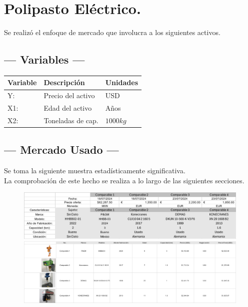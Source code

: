 
\section{Polipasto Eléctrico.} %
Se realizó el enfoque de mercado que involucra a los siguientes activos.

\subsection{\centering --- Variables ---} %
\begin{center}
  \begin{tabular}{|l|l|l|}
    \hline 
    Variable & Descripción   & Unidades\\ \hline 
    Y:  & Precio del activo  & USD \\ \hline 
    X1: & Edad del activo    & Años \\ \hline 
		X2: & Toneladas de cap.  & \(1000kg\) \\ \hline 
  \end{tabular}
\end{center} 

\subsection{\centering --- Mercado Usado ---} %
Se toma la siguiente muestra estadísticamente significativa. \\ 
La comprobación de este hecho se realiza a lo largo de las siguientes secciones.
\begin{figure}[hbtp!]
	\centering
\includegraphics[width=  \linewidth, page = 1]{../0.imagenes/CAP_8/mercado_2_1}
\includegraphics[width=  \linewidth, page = 1]{../0.imagenes/CAP_8/mercado_2_2}
\end{figure}

